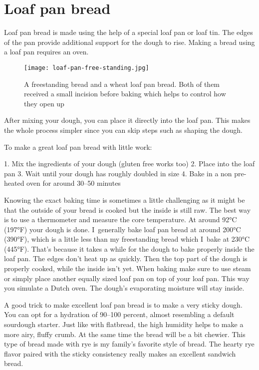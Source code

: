 \section{Loaf pan bread}

Loaf pan bread is made using the help of a special loaf pan
or loaf tin. The edges of the pan provide additional support
for the dough to rise. Making a bread using a loaf pan requires
an oven.

\begin{figure}[!htb]
  \texttt{[image: loaf-pan-free-standing.jpg]}
  \caption{A freestanding bread and a wheat loaf pan bread. Both of them
  received a small incision before baking which helps to control how they open up}
  \label{fig:free-standing-loaf-pan}
\end{figure}

After mixing your dough, you can place it directly into the loaf pan.
This makes the whole process simpler since you can skip steps such
as shaping the dough.

To make a great loaf pan bread with little work:

1. Mix the ingredients of your dough (gluten free works too)
2. Place into the loaf pan
3. Wait until your dough has roughly doubled in size
4. Bake in a non pre-heated oven for around 30--50 minutes

Knowing the exact baking time is sometimes a little challenging
as it might be that the outside of your bread is cooked but
the inside is still raw. The best way is to use a thermometer
and measure the core temperature. At around 92°C (197°F) your
dough is done. I~generally bake loaf pan bread at around 200°C (390°F),
which is a little less than my freestanding bread which I~bake
at 230°C (445°F). That's because it takes a while for the dough
to bake properly inside the loaf pan. The edges don't heat up
as quickly. Then the top part of the dough is properly cooked, while
the inside isn't yet. When baking make sure to use steam
or simply place another equally sized loaf pan on top
of your loaf pan. This way you simulate a Dutch oven. The dough's
evaporating moisture will stay inside.

A good trick to make excellent loaf pan bread is to make a very
sticky dough. You can opt for a hydration of 90--100 percent, almost
resembling a default sourdough starter. Just like with flatbread,
the high humidity helps to make a more airy, fluffy crumb. At
the same time the bread will be a bit chewier. This
type of bread made with rye is my family's favorite style of bread.
The hearty rye flavor paired with the sticky consistency really
makes an excellent sandwich bread.


